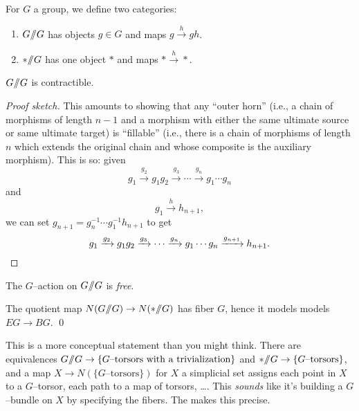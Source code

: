 
\begin{example}
For $G$ a group, we define two categories:
\begin{enumerate}
    \item $G /\!\!/ G$ has objects $g \in G$ and maps $g \xrightarrow h gh$.
    \item $* /\!\!/ G$ has one object $*$ and maps $* \xrightarrow h *$.
\end{enumerate}
\end{example}

\begin{lemma}
$G /\!\!/ G$ is contractible.
\end{lemma}
\begin{proof}[Proof sketch]
This amounts to showing that any ``outer horn'' (i.e., a chain of morphisms of length $n-1$ and a morphism with either the same ultimate source or same ultimate target) is ``fillable'' (i.e., there is a chain of morphisms of length $n$ which extends the original chain and whose composite is the auxiliary morphism).
This is so: given \[g_1 \xrightarrow{g_2} g_1 g_2 \xrightarrow{g_3} \cdots \xrightarrow{g_n} g_1 \cdots g_n\] and \[g_1 \xrightarrow{h} h_{n+1},\] we can set $g_{n+1} = g_n^{-1} \cdots g_1^{-1} h_{n+1}$ to get \[g_1 \xrightarrow{g_2} g_1 g_2 \xrightarrow{g_3} \cdots \xrightarrow{g_n} g_1 \cdots g_n \xrightarrow{g_{n+1}} h_{n+1}. \qedhere\]
\end{proof}

\begin{remark}
The $G$--action on $G /\!\!/ G$ is \emph{free}.
\end{remark}

\begin{corollary}
The quotient map $N(G /\!\!/ G) \to N(* /\!\!/ G)$ has fiber $G$, hence it models models $EG \to BG$. \qed
\end{corollary}

\begin{remark}
This is a more conceptual statement than you might think.
There are equivalences $G /\!\!/ G \to \{\text{$G$--torsors with a trivialization}\}$ and $* /\!\!/ G \to \{\text{$G$--torsors}\}$, and a map $X \to N(\{\text{$G$--torsors}\})$ for $X$ a simplicial set assigns each point in $X$ to a $G$--torsor, each path to a map of torsors, \ldots .
This \emph{sounds} like it's building a $G$--bundle on $X$ by specifying the fibers.
The  makes this precise.
\end{remark}

